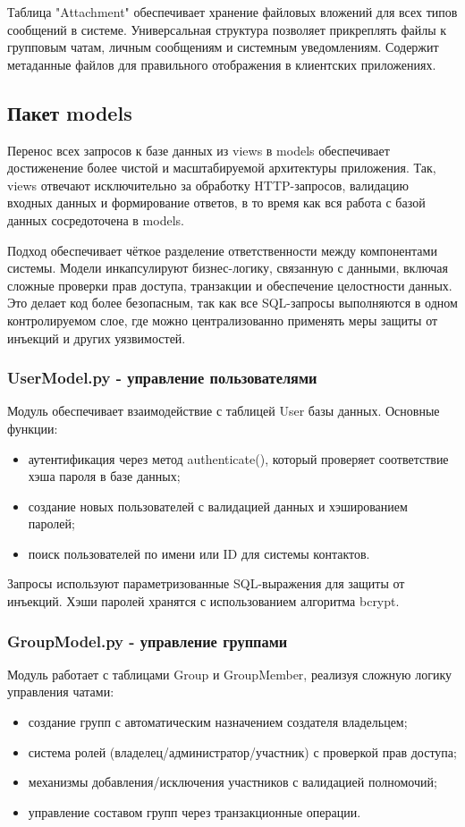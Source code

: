 Таблица "Attachment" обеспечивает хранение файловых вложений для всех типов сообщений в системе. Универсальная структура позволяет прикреплять файлы к групповым чатам, личным сообщениям и системным уведомлениям. Содержит метаданные файлов для правильного отображения в клиентских приложениях.

\subsection{Пакет models}

Перенос всех запросов к базе данных из views в models обеспечивает достиженение более чистой и масштабируемой архитектуры приложения. Так, views отвечают исключительно за обработку HTTP-запросов, валидацию входных данных и формирование ответов, в то время как вся работа с базой данных сосредоточена в models.

Подход обеспечивает чёткое разделение ответственности между компонентами системы. Модели инкапсулируют бизнес-логику, связанную с данными, включая сложные проверки прав доступа, транзакции и обеспечение целостности данных. Это делает код более безопасным, так как все SQL-запросы выполняются в одном контролируемом слое, где можно централизованно применять меры защиты от инъекций и других уязвимостей.

\subsubsection{UserModel.py - управление пользователями}
Модуль обеспечивает взаимодействие с таблицей User базы данных. Основные функции:
\begin{itemize}
	\item аутентификация через метод authenticate(), который проверяет соответствие хэша пароля в базе данных;
	\item создание новых пользователей с валидацией данных и хэшированием паролей;
	\item поиск пользователей по имени или ID для системы контактов.
\end{itemize}

Запросы используют параметризованные SQL-выражения для защиты от инъекций. Хэши паролей хранятся с использованием алгоритма bcrypt.

\subsubsection{GroupModel.py - управление группами}
Модуль работает с таблицами Group и GroupMember, реализуя сложную логику управления чатами:
\begin{itemize}
	\item создание групп с автоматическим назначением создателя владельцем;
	\item система ролей (владелец/администратор/участник) с проверкой прав доступа;
	\item механизмы добавления/исключения участников с валидацией полномочий;
	\item управление составом групп через транзакционные операции.
\end{itemize}

